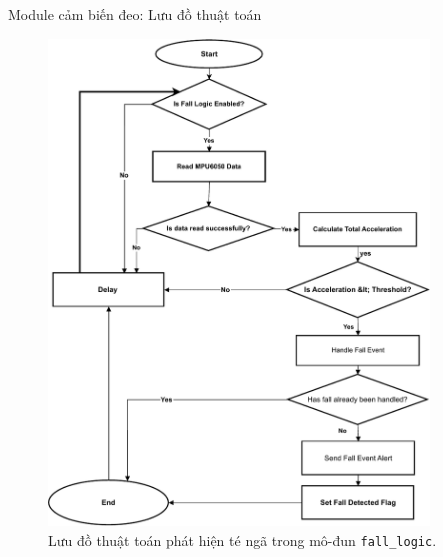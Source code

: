 \begin{frame}[fragile]{Module cảm biến đeo: Lưu đồ thuật toán}
    \begin{figure}
        \centering
        \includegraphics[width=0.9\textwidth,height=0.8\textheight,keepaspectratio]{images/module1_fall_logic_diagram.pdf}
        \caption{Lưu đồ thuật toán phát hiện té ngã trong mô-đun \texttt{fall\_logic}.}
        \label{fig:fall_logic_flow}
    \end{figure}
\end{frame}
